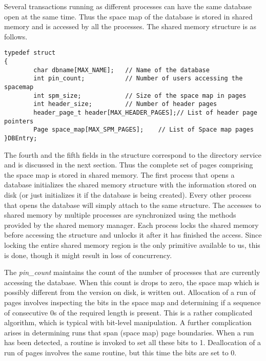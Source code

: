 Several transactions running as different processes  can have the same
database open at the same time. Thus the space  map of the database is
stored in  shared memory and is  accessed by  all  the processes.  The
shared memory structure is as follows.

\begin{verbatim}
typedef struct 
{
        char dbname[MAX_NAME];   // Name of the database
        int pin_count;           // Number of users accessing the spacemap
        int spm_size;            // Size of the space map in pages
        int header_size;         // Number of header pages
        header_page_t header[MAX_HEADER_PAGES];// List of header page pointers
        Page space_map[MAX_SPM_PAGES];    // List of Space map pages
}DBEntry;               
\end{verbatim}

The fourth  and the fifth  fields in the   structure correspond to the
directory  service   and is discussed  in the   next section. Thus the
complete set of  pages comprising the  space map  is  stored in shared
memory. The first process that opens a database initializes the shared
memory  structure   with  the information   stored   on  disk (or just
initializes it if the database  is being created). Every other process
that opens the database will simply  attach to the same structure. The
accesses to shared memory by multiple processes are synchronized using
the methods provided by the shared memory  manager. Each process locks
the shared memory before accessing  the structure and unlocks it after
it has finished  the access. Since  locking  the entire shared  memory
region is the only primitive available to us,  this is done, though it
might result in loss of concurrency.

The {\em pin\_count}  maintains the count of   the number of  processes
that are currently accessing the database. When this count is drops to
zero, the  space map which is  possibly different from the  version on
disk, is written out. Allocation of a run of pages involves inspecting
the bits in the space map and determining if a sequence of consecutive
0s  of the required  length is present.  This  is a rather complicated
algorithm, which  is  typical with  bit-level manipulation.  A further
complication arises  in  determining runs that  span  (space map) page
boundaries. When a run has been detected, a  routine is invoked to set
all these bits to 1. Deallocation of a run  of pages involves the same
routine, but this time the bits are set to 0.

